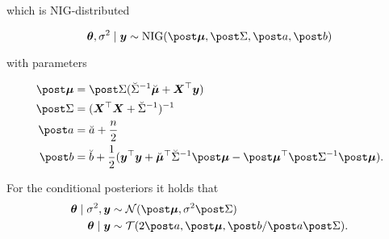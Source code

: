 which is NIG-distributed

\begin{equation*}
    \btheta, \ssd \mid \by \sim \text{NIG}(\mupo, \Sdpo, \apo, \bpo)
\end{equation*}

with parameters

\begin{equation*}
    \begin{aligned}
        \mupo &= \Sdpo (\Sdipri \mupri + \bX^\top \by) \\
        \Sdpo &= (\bX^\top \bX + \Sdipri)^{-1} \\
        \apo &= \apri + \frac{n}{2}\\
        \bpo &= \bpri + \frac{1}{2} ( \by^\top \by + \mupri^\top \Sdipri \mupo - \mupo^\top \Sdipo \mupo).
    \end{aligned}
\end{equation*}

For the conditional posteriors it holds that
\begin{equation*}
    \begin{aligned}
        \btheta \mid \ssd, \by &\sim \Ncal(\mupo, \ssd \Sdpo) \\
        \btheta \mid \by &\sim \Tcal(2 \apo, \mupo, \bpo / \apo \Sdpo).
    \end{aligned}
\end{equation*}

